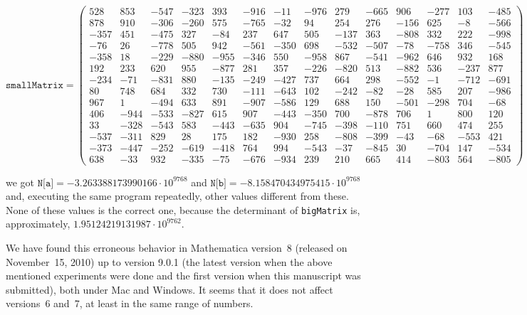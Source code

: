\documentclass[12pt]{article}
\begin{document}
\begin{scriptsize}
\[
  \texttt{smallMatrix} =
\left(
\begin{array}{rrrrrrrrrrrrrr}
 528 & 853 & -547 & -323 & 393 & -916 & -11 & -976 & 279 & -665 & 906 & -277 &
   103 & -485 \\
 878 & 910 & -306 & -260 & 575 & -765 & -32 & 94 & 254 & 276 & -156 & 625 & -8 &
   -566 \\
 -357 & 451 & -475 & 327 & -84 & 237 & 647 & 505 & -137 & 363 & -808 & 332 & 222
   & -998 \\
 -76 & 26 & -778 & 505 & 942 & -561 & -350 & 698 & -532 & -507 & -78 & -758 &
   346 & -545 \\
 -358 & 18 & -229 & -880 & -955 & -346 & 550 & -958 & 867 & -541 & -962 & 646 &
   932 & 168 \\
 192 & 233 & 620 & 955 & -877 & 281 & 357 & -226 & -820 & 513 & -882 & 536 &
   -237 & 877 \\
 -234 & -71 & -831 & 880 & -135 & -249 & -427 & 737 & 664 & 298 & -552 & -1 &
   -712 & -691 \\
 80 & 748 & 684 & 332 & 730 & -111 & -643 & 102 & -242 & -82 & -28 & 585 & 207 &
   -986 \\
 967 & 1 & -494 & 633 & 891 & -907 & -586 & 129 & 688 & 150 & -501 & -298 & 704
   & -68 \\
 406 & -944 & -533 & -827 & 615 & 907 & -443 & -350 & 700 & -878 & 706 & 1 & 800
   & 120 \\
 33 & -328 & -543 & 583 & -443 & -635 & 904 & -745 & -398 & -110 & 751 & 660 &
   474 & 255 \\
 -537 & -311 & 829 & 28 & 175 & 182 & -930 & 258 & -808 & -399 & -43 & -68 &
   -553 & 421 \\
 -373 & -447 & -252 & -619 & -418 & 764 & 994 & -543 & -37 & -845 & 30 & -704 &
   147 & -534 \\
 638 & -33 & 932 & -335 & -75 & -676 & -934 & 239 & 210 & 665 & 414 & -803 & 564
   & -805
\end{array}
\right)
\]
\end{scriptsize}%
we got $\texttt{N[a]} = -3.263388173990166 \cdot 10^{9768}$ and $\texttt{N[b]} = -8.158470434975415 \cdot 10^{9768}$ and, executing the same program repeatedly, other values different from these. None of these values is the correct one, because the determinant of \texttt{bigMatrix} is, approximately, $1.95124219131987 \cdot 10^{9762}$.

We have found this erroneous behavior in Mathematica version~8 (released on November~15, 2010) up to version 9.0.1 (the latest version when the above mentioned experiments were done and the first version when this manuscript was submitted),
both under Mac and Windows. It seems that it does not affect versions~6 and~7, at least in the same range of numbers.
\end{document}
